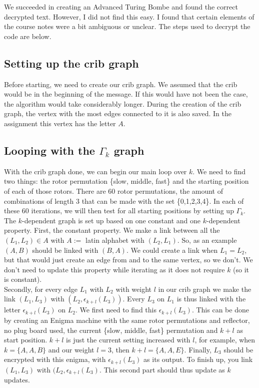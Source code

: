\documentclass{article}
\begin{document}
We succeeded in creating an Advanced Turing Bombe and found the correct decrypted text. However, I did not find this easy. I found that certain elements of the course notes were a bit ambiguous or unclear. The steps used to decrypt the code are below.

\subsection{Setting up the crib graph}

Before starting, we need to create our crib graph. We assumed that the crib would be in the beginning of the message. If this would have not been the case, the algorithm would take considerably longer. During the creation of the crib graph, the vertex with the most edges connected to it is also saved. In the assignment this vertex has the letter $A$.

\subsection{Looping with the $\Gamma_k$ graph}

With the crib graph done, we can begin our main loop over $k$. We need to find two things: the rotor permutation \{slow, middle, fast\} and the starting position of each of those rotors. There are 60 rotor permutations, the amount of combinations of length 3 that can be made with the set \{0,1,2,3,4\}. In each of these 60 iterations, we will then test for all starting positions by setting up $\Gamma_k$.\\

The $k$-dependent graph is set up based on one constant and one $k$-dependent property. First, the constant property. We make a link between all the $(L_1, L_2) \in A$ with $A:=$ latin alphabet with $(L_2, L_1)$. So, as an example $(A,B)$ should be linked with $(B,A)$. We could create a link when $L_1 = L_2$, but that would just create an edge from and to the same vertex, so we don't. We don't need to update this property while iterating as it does not require $k$ (so it is constant).\\

Secondly, for every edge $L_1$ with $L_2$ with weight $l$ in our crib graph we make the link $(L_1, L_3)$ with $(L_2, \epsilon_{k+l}(L_3))$. Every $L_3$ on $L_1$ is thus linked with the letter $\epsilon_{k+l}(L_3)$ on $L_2$. We first need to find this $\epsilon_{k+l}(L_3)$. This can be done by creating an Enigma machine with the same rotor permutations and reflector, no plug board used, the current \{slow, middle, fast\} permutation and $k+l$ as start position. $k+l$ is just the current setting increased with $l$, for example, when $k = \{A,A,B\}$ and our weight $l=3$, then $k+l = \{A,A,E\}$. Finally, $L_3$ should be encrypted with this enigma, with $\epsilon_{k+l}(L_3)$ as its output. To finish up, you link $(L_1, L_3)$ with $(L_2, \epsilon_{k+l}(L_3)$. This second part should thus update as $k$ updates.
\end{document}
